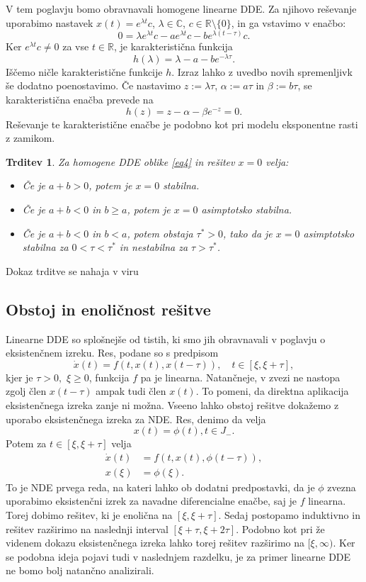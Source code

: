 \documentclass[12pt,a4paper]{amsart}
\theoremstyle{definition} %
\theoremstyle{plain} %
\newtheorem{trditev}[definicija]{Trditev}
\newcommand{\R}{\mathbb R}
\newcommand{\C}{\mathbb C}
\begin{document}
V tem poglavju bomo obravnavali homogene linearne DDE. Za njihovo reševanje uporabimo nastavek
$x(t)=e^{\lambda t}c$, $\lambda \in\C$, $c\in\R\setminus\{0\}$, in ga vstavimo v enačbo:
\begin{equation*}
        0 = \lambda e^{\lambda t}c - ae^{\lambda t}c -be^{\lambda(t-\tau)}c.   
\end{equation*}
Ker $e^{\lambda t}c \neq0$ za vse $t\in\R$, je karakteristična funkcija
\[h(\lambda)=\lambda-a-be^{-\lambda\tau}.\]
Iščemo ničle karakteristične funkcije $h$. Izraz lahko z uvedbo novih spremenljivk še dodatno 
poenostavimo. Če nastavimo $z:=\lambda\tau$, $\alpha:=a\tau$ in $\beta:=b\tau$, se karakteristična
enačba prevede na
\[h(z)=z-\alpha-\beta e^{-z}=0.\]
Reševanje te karakteristične enačbe je podobno kot pri modelu eksponentne rasti z zamikom.
\begin{trditev}
    Za homogene DDE oblike \eqref{eq4} in rešitev $x=0$ velja:
    \begin{itemize}
        \item Če je $a+b>0$, potem je $x=0$ stabilna.
        \item Če je $a+b<0$ in $b\geq a$, potem je $x=0$ asimptotsko stabilna.
        \item Če je $a+b<0$ in $b<a$, potem obstaja $\tau^{*}>0$, tako da je $x=0$ 
        asimptotsko stabilna za $0<\tau<\tau^{*}$ in nestabilna za $\tau>\tau^{*}$.
    \end{itemize}
\end{trditev}
\noindent Dokaz trditve se nahaja v viru \cite{envir}

\subsection{Obstoj in enoličnost rešitve}
Linearne DDE so splošnejše od tistih, ki smo jih obravnavali v poglavju o eksistenčnem izreku.
Res, podane so s predpisom
\[\dot{x}(t)=f(t,x(t),x(t-\tau)), \quad t\in[\xi,\xi+\tau],\]
kjer je $\tau>0,$ $\xi\geq 0$, funkcija $f$ pa je linearna. Natančneje, v zvezi ne nastopa zgolj člen $x(t-\tau)$ ampak tudi člen $x(t)$. To pomeni, da direktna aplikacija eksistenčnega izreka zanje ni možna. Vseeno lahko obstoj rešitve dokažemo z uporabo eksistenčnega izreka za NDE. Res, denimo da velja
$$x(t)=\phi(t), t\in J_{-}.$$
Potem za $t\in[\xi,\xi+\tau]$ velja 
\begin{equation*}
    \begin{split}
        \dot{x}(t)&=f(t,x(t),\phi(t-\tau)), \\
        x(\xi) &= \phi(\xi).
    \end{split}
\end{equation*}
To je NDE prvega reda, na kateri lahko ob dodatni predpostavki, da je $\phi$ zvezna uporabimo eksistenčni izrek za navadne 
diferencialne enačbe, saj je $f$ linearna. Torej dobimo rešitev, ki je enolična na $[\xi,\xi+\tau]$. Sedaj postopamo 
induktivno in rešitev razširimo na naslednji interval $[\xi+\tau,\xi+2\tau]$.
Podobno kot pri že videnem dokazu eksistenčnega izreka lahko torej rešitev razširimo na $[\xi,\infty)$.
Ker se podobna ideja pojavi tudi v naslednjem razdelku, je za primer linearne DDE ne bomo bolj natančno analizirali.
\end{document}
